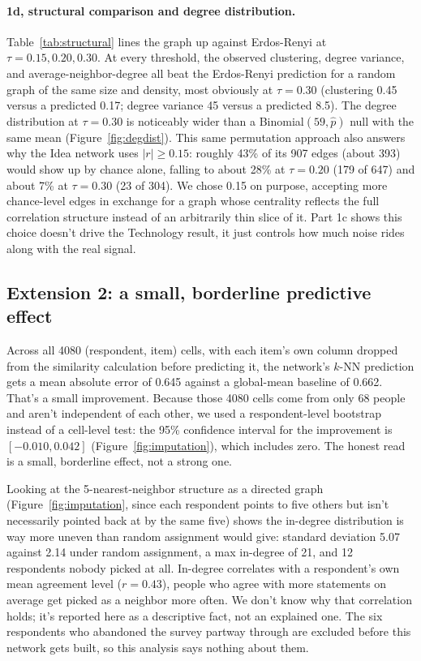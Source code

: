 \documentclass[11pt]{article}
\begin{document}
\paragraph{1d, structural comparison and degree distribution.} Table~\ref{tab:structural} lines the
graph up against Erdos-Renyi at $\tau = 0.15, 0.20, 0.30$. At every threshold, the observed clustering,
degree variance, and average-neighbor-degree all beat the Erdos-Renyi prediction for a random graph of
the same size and density, most obviously at $\tau = 0.30$ (clustering 0.45 versus a predicted 0.17;
degree variance 45 versus a predicted 8.5). The degree distribution at $\tau = 0.30$ is noticeably
wider than a Binomial$(59, \hat p)$ null with the same mean (Figure~\ref{fig:degdist}). This same
permutation approach also answers why the Idea network uses $|r| \geq 0.15$: roughly 43\% of its 907
edges (about 393) would show up by chance alone, falling to about 28\% at $\tau = 0.20$ (179 of 647)
and about 7\% at $\tau = 0.30$ (23 of 304). We chose 0.15 on purpose, accepting more chance-level edges
in exchange for a graph whose centrality reflects the full correlation structure instead of an
arbitrarily thin slice of it. Part 1c shows this choice doesn't drive the Technology result, it just
controls how much noise rides along with the real signal.

\subsection{Extension 2: a small, borderline predictive effect}

Across all 4080 (respondent, item) cells, with each item's own column dropped from the similarity
calculation before predicting it, the network's $k$-NN prediction gets a mean absolute error of 0.645
against a global-mean baseline of 0.662. That's a small improvement. Because those 4080 cells come from
only 68 people and aren't independent of each other, we used a respondent-level bootstrap instead of a
cell-level test: the 95\% confidence interval for the improvement is $[-0.010, 0.042]$
(Figure~\ref{fig:imputation}), which includes zero. The honest read is a small, borderline effect, not
a strong one.

Looking at the 5-nearest-neighbor structure as a directed graph (Figure~\ref{fig:imputation}, since each
respondent points to five others but isn't necessarily pointed back at by the same five) shows the
in-degree distribution is way more uneven than random assignment would give: standard deviation 5.07
against 2.14 under random assignment, a max in-degree of 21, and 12 respondents nobody picked at all.
In-degree correlates with a respondent's own mean agreement level ($r = 0.43$), people who agree with
more statements on average get picked as a neighbor more often. We don't know why that correlation
holds; it's reported here as a descriptive fact, not an explained one. The six respondents who
abandoned the survey partway through are excluded before this network gets built, so this analysis
says nothing about them.
\end{document}
